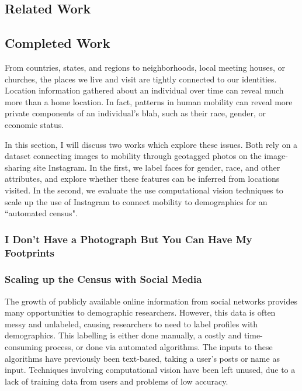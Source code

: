 
\subsection{Related Work}


\subsection{Completed Work}
From countries, states, and regions to neighborhoods, local meeting houses, or churches, the places we live and visit are tightly connected to our identities.
Location information gathered about an individual over time can reveal much more than a home location.
In fact, patterns in human mobility can reveal more private components of an individual's 
blah, such as their race, gender, or economic status.

In this section, I will discuss two works which explore these issues.
Both rely on a dataset connecting images to mobility through geotagged photos on the image-sharing site Instagram.
In the first, we label faces for gender, race, and other attributes, and explore whether these features can be inferred from locations visited.
In the second, we evaluate the use computational vision techniques to scale up the use of Instagram to connect mobility to demographics for an ``automated census".


\subsubsection{I Don’t Have a Photograph But You Can Have My Footprints}




\subsubsection{Scaling up the Census with Social Media}

The growth of publicly available online information from social networks provides many opportunities to demographic researchers.
However, this data is often messy and unlabeled, causing researchers to need to label profiles with demographics.
This labelling is either done manually, a costly and time-consuming process, or done via automated algorithms.
The inputs to these algorithms have previously been text-based, taking a user's posts or name as input.
Techniques involving computational vision have been left unused, due to a lack of training data from users and problems of low accuracy.

